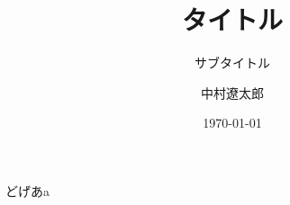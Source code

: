 \documentclass[dvipdfmx]{beamer}
\title[ショートタイトル]{タイトル}
\subtitle[ショートサブタイトル]{サブタイトル}
\institute{Coda, Inc.}
\author[short author name]{中村遼太郎}
\date{\today}
\begin{document}
\begin{frame}
  \titlepage
\end{frame}
\begin{frame}{どげあa}
\end{frame}
\end{document}
